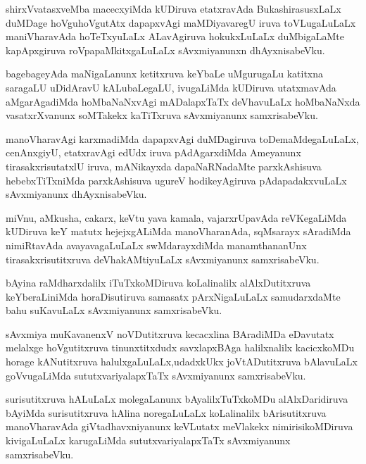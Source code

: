 \documentclass{article}
\begin{document}
\begin{mn}%
shirxVvatasxveMba macecxyiMda kUDiruva etatxravAda BukashirasusxLaLx duMDage 
hoVguhoVgutAtx dapapxvAgi maMDiyavaregU iruva toVLugaLuLaLx maniVharavAda hoTeTxyuLaLx 
ALavAgiruva hokukxLuLaLx duMbigaLaMte kapApxgiruva roVpapaMkitxgaLuLaLx sAvxmiyanunxn 
dhAyxnisabeVku.
\end{mn}

\begin{mn}%
bagebageyAda maNigaLanunx ketitxruva keYbaLe uMgurugaLu katitxna saragaLU uDidAravU 
kALubaLegaLU, ivugaLiMda kUDiruva utatxmavAda aMgarAgadiMda hoMbaNaNxvAgi mADalapxTaTx 
deVhavuLaLx hoMbaNaNxda vasatxrXvanunx soMTakekx kaTiTxruva sAvxmiyanunx samxrisabeVku.
\end{mn}

\begin{mn}%
manoVharavAgi karxmadiMda dapapxvAgi duMDagiruva toDemaMdegaLuLaLx, cenAnxgiyU, 
etatxravAgi edUdx iruva pAdAgarxdiMda Ameyanunx tirasakxrisutatxlU iruva, mANikayxda 
dapaNaRNadaMte parxkAshisuva hebebxTiTxniMda parxkAshisuva ugureV hodikeyAgiruva 
pAdapadakxvuLaLx sAvxmiyanunx dhAyxnisabeVku.
\end{mn}

\begin{mn}%
miVnu, aMkusha, cakarx, keVtu yava kamala, vajarxrUpavAda reVKegaLiMda kUDiruva keY matutx 
hejejxgALiMda manoVharanAda, sqMsarayx sAradiMda nimiRtavAda avayavagaLuLaLx 
swMdarayxdiMda manamthananUnx tirasakxrisutitxruva deVhakAMtiyuLaLx sAvxmiyanunx 
samxrisabeVku.
\end{mn}

\begin{mn}%
bAyina raMdharxdalilx iTuTxkoMDiruva koLalinalilx alAlxDutitxruva keYberaLiniMda 
horaDisutiruva samasatx pArxNigaLuLaLx samudarxdaMte bahu suKavuLaLx sAvxmiyanunx 
samxrisabeVku.
\end{mn}

\begin{mn}%
sAvxmiya muKavanenxV noVDutitxruva kecacxlina BAradiMDa eDavutatx melalxge hoVgutitxruva 
tinunxtitxdudx savxlapxBAga halilxnalilx kacicxkoMDu horage kANutitxruva 
halulxgaLuLaLx,udadxkUkx joVtADutitxruva bAlavuLaLx goVvugaLiMda sututxvariyalapxTaTx 
sAvxmiyanunx samxrisabeVku.
\end{mn}

\begin{mn}%
surisutitxruva hALuLaLx molegaLanunx bAyalilxTuTxkoMDu alAlxDaridiruva bAyiMda 
surisutitxruva hAlina noregaLuLaLx koLalinalilx bArisutitxruva manoVharavAda 
giVtadhavxniyanunx keVLutatx meVlakekx  nimirisikoMDiruva kivigaLuLaLx karugaLiMda 
sututxvariyalapxTaTx sAvxmiyanunx samxrisabeVku.
\end{mn}
\end{document}
